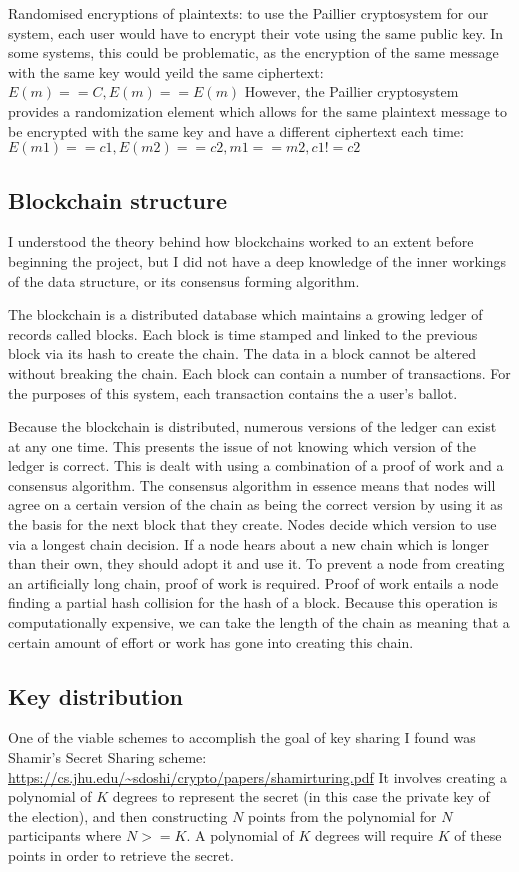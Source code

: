 \documentclass[a4paper,12pt]{article}
\begin{document}
Randomised encryptions of plaintexts: to use the Paillier cryptosystem for our system, each user would have to encrypt their vote using the same public key. In some systems, this could be problematic, as the encryption of the same message with the same key would yeild the same ciphertext:
\(
E(m) == C, E(m) == E(m)
\)
However, the Paillier cryptosystem provides a randomization element which allows for the same plaintext message to be encrypted with the same key and have a different ciphertext each time:
\(
E(m1) == c1, E(m2) == c2, m1 == m2, c1 != c2
\)

\subsection{Blockchain structure}
I understood the theory behind how blockchains worked to an extent before beginning the project, but I did not have a deep knowledge of the inner workings of the data structure, or its consensus forming algorithm.

The blockchain is a distributed database which maintains a growing ledger of records called blocks. Each block is time stamped and linked to the previous block via its hash to create the chain. The data in a block cannot be altered without breaking the chain. Each block can contain a number of transactions. For the purposes of this system, each transaction contains the a user's ballot.

Because the blockchain is distributed, numerous versions of the ledger can exist at any one time. This presents the issue of not knowing which version of the ledger is correct. This is dealt with using a combination of a proof of work and a consensus algorithm. The consensus algorithm in essence means that nodes will agree on a certain version of the chain as being the correct version by using it as the basis for the next block that they create. Nodes decide which version to use via a longest chain decision. If a node hears about a new chain which is longer than their own, they should adopt it and use it. To prevent a node from creating an artificially long chain, proof of work is required. Proof of work entails a node finding a partial hash collision for the hash of a block. Because this operation is computationally expensive, we can take the length of the chain as meaning that a certain amount of effort or work has gone into creating this chain.

\subsection{Key distribution}
One of the viable schemes to accomplish the goal of key sharing I found was Shamir's Secret Sharing scheme:
\url{https://cs.jhu.edu/~sdoshi/crypto/papers/shamirturing.pdf}
It involves creating a polynomial of \(K\) degrees to represent the secret (in this case the private key of the election), and then constructing \(N\) points from the polynomial for \(N\) participants where \(N >= K\). A polynomial of \(K\) degrees will require \(K\) of these points in order to retrieve the secret.
\end{document}
